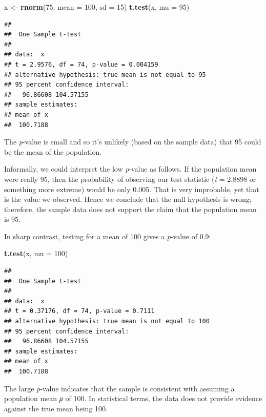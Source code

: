 \documentclass[
]{book}
\newenvironment{Shaded}{\begin{snugshade}}{\end{snugshade}}
\newcommand{\DataTypeTok}[1]{\textcolor[rgb]{0.13,0.29,0.53}{#1}}
\newcommand{\DecValTok}[1]{\textcolor[rgb]{0.00,0.00,0.81}{#1}}
\newcommand{\KeywordTok}[1]{\textcolor[rgb]{0.13,0.29,0.53}{\textbf{#1}}}
\newcommand{\NormalTok}[1]{#1}
\newcommand{\StringTok}[1]{\textcolor[rgb]{0.31,0.60,0.02}{#1}}
\begin{document}
\begin{Shaded}
\begin{Highlighting}[]
\NormalTok{x <-}\StringTok{ }\KeywordTok{rnorm}\NormalTok{(}\DecValTok{75}\NormalTok{, }\DataTypeTok{mean =} \DecValTok{100}\NormalTok{, }\DataTypeTok{sd =} \DecValTok{15}\NormalTok{)}
\KeywordTok{t.test}\NormalTok{(x, }\DataTypeTok{mu =} \DecValTok{95}\NormalTok{)}
\end{Highlighting}
\end{Shaded}

\begin{verbatim}
## 
## 	One Sample t-test
## 
## data:  x
## t = 2.9576, df = 74, p-value = 0.004159
## alternative hypothesis: true mean is not equal to 95
## 95 percent confidence interval:
##   96.86608 104.57155
## sample estimates:
## mean of x 
##  100.7188
\end{verbatim}

The \emph{p}-value is small and so it's unlikely (based on the sample data)
that 95 could be the mean of the population.

Informally, we could interpret the low \emph{p}-value as follows. If the
population mean were really 95, then the probability of observing our
test statistic (\emph{t} = 2.8898 or something more extreme) would be only
0.005. That is very improbable, yet that is the value we observed.
Hence we conclude that the null hypothesis is wrong; therefore, the
sample data does not support the claim that the population mean is 95.

In sharp contrast, testing for a mean of 100 gives a \emph{p}-value of
0.9:

\begin{Shaded}
\begin{Highlighting}[]
\KeywordTok{t.test}\NormalTok{(x, }\DataTypeTok{mu =} \DecValTok{100}\NormalTok{)}
\end{Highlighting}
\end{Shaded}

\begin{verbatim}
## 
## 	One Sample t-test
## 
## data:  x
## t = 0.37176, df = 74, p-value = 0.7111
## alternative hypothesis: true mean is not equal to 100
## 95 percent confidence interval:
##   96.86608 104.57155
## sample estimates:
## mean of x 
##  100.7188
\end{verbatim}

The large \emph{p}-value indicates that the sample is consistent with
assuming a population mean \emph{μ} of 100. In statistical terms, the data
does not provide evidence against the true mean being 100.
\end{document}
